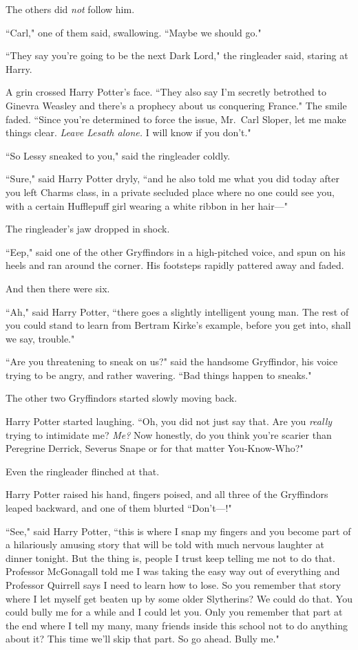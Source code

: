 The others did \emph{not} follow him.

``Carl," one of them said, swallowing. ``Maybe we should go."

``They say you're going to be the next Dark Lord," the ringleader said, staring at Harry.

A grin crossed Harry Potter's face. ``They also say I'm secretly betrothed to Ginevra Weasley and there's a prophecy about us conquering France." The smile faded. ``Since you're determined to force the issue, Mr.~Carl Sloper, let me make things clear. \emph{Leave Lesath alone.} I will know if you don't."

``So Lessy sneaked to you," said the ringleader coldly.

``Sure," said Harry Potter dryly, ``and he also told me what you did today after you left Charms class, in a private secluded place where no one could see you, with a certain Hufflepuff girl wearing a white ribbon in her hair---"

The ringleader's jaw dropped in shock.

``Eep," said one of the other Gryffindors in a high-pitched voice, and spun on his heels and ran around the corner. His footsteps rapidly pattered away and faded.

And then there were six.

``Ah," said Harry Potter, ``there goes a slightly intelligent young man. The rest of you could stand to learn from Bertram Kirke's example, before you get into, shall we say, trouble."

``Are you threatening to sneak on us?" said the handsome Gryffindor, his voice trying to be angry, and rather wavering. ``Bad things happen to sneaks."

The other two Gryffindors started slowly moving back.

Harry Potter started laughing. ``Oh, you did not just say that. Are you \emph{really} trying to intimidate me? \emph{Me?} Now honestly, do you think you're scarier than Peregrine Derrick, Severus Snape or for that matter You-Know-Who?"

Even the ringleader flinched at that.

Harry Potter raised his hand, fingers poised, and all three of the Gryffindors leaped backward, and one of them blurted ``Don't---!"

``See," said Harry Potter, ``this is where I snap my fingers and you become part of a hilariously amusing story that will be told with much nervous laughter at dinner tonight. But the thing is, people I trust keep telling me not to do that. Professor McGonagall told me I was taking the easy way out of everything and Professor Quirrell says I need to learn how to lose. So you remember that story where I let myself get beaten up by some older Slytherins? We could do that. You could bully me for a while and I could let you. Only you remember that part at the end where I tell my many, many friends inside this school not to do anything about it? This time we'll skip that part. So go ahead. Bully me."

